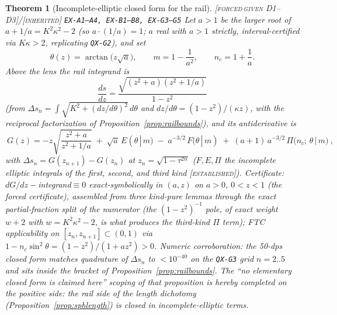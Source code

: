 \documentclass[11pt]{article}
\newcommand{\tagFD}{\textcolor{cF}{\textsc{[forced}}\,\textcolor{cD}{\textsc{given D1--D3]}}}
\newcommand{\tagI}{\textcolor{cI}{\textsc{[inherited]}}}
\newcommand{\tagE}{\textcolor{cE}{\textsc{[established]}}}
\newcommand{\hx}[1]{\textcolor{cC}{\footnotesize\texttt{#1}}}
\theoremstyle{plain}
\newtheorem{theorem}{Theorem}[section]
\theoremstyle{definition}
\theoremstyle{remark}
\begin{document}
\begin{theorem}[Incomplete-elliptic closed form for the rail]\label{thm:railclosed}\tagFD{}/\tagI{} \hx{EX-A1--A4, EX-B1--B8, EX-G3--G5}
Let $a>1$ be the larger root of $a+1/a=K^2\kappa^2-2$ (so
$a\cdot(1/a)=1$; $a$ real with $a>1$ strictly, interval-certified via
$K\kappa>2$, replicating \hx{QX-G2}), and set
\[
\theta(z)=\arctan\!\bigl(z\sqrt a\bigr),\qquad
m=1-\frac1{a^2},\qquad
n_c=1+\frac1a .
\]
Above the lens the rail integrand is
\[
\frac{ds}{dz}=\frac{\sqrt{(z^2+a)(z^2+1/a)}}{1-z^2}
\]
(from $\Delta s_n=\int\sqrt{K^2+(dz/d\theta)^2}\,d\theta$ and
$dz/d\theta=(1-z^2)/(\kappa z)$, with the reciprocal factorization of
Proposition~\ref{prop:railbounds}), and its antiderivative is
\[
\boxed{\ G(z)=-z\sqrt{\frac{z^2+a}{z^2+1/a}}
\;+\;\sqrt a\,E(\theta\,|\,m)
\;-\;a^{-3/2}\,F(\theta\,|\,m)
\;+\;(a+1)\,a^{-3/2}\,\Pi\!\bigl(n_c;\,\theta\,|\,m\bigr)\ },
\]
with $\Delta s_n=G(z_{n+1})-G(z_n)$ at $z_n=\sqrt{1-\tau^{2n}}$
($F,E,\Pi$ the incomplete elliptic integrals of the first, second, and
third kind \tagE{}). Certificate: $dG/dz-{}$integrand${}\equiv0$
exact-symbolically in $(a,z)$ on $a>0$, $0<z<1$ (the forced certificate),
assembled from three kind-pure lemmas through the exact partial-fraction
split of the numerator (the $(1-z^2)^{-1}$ pole, of exact weight $w+2$
with $w=K^2\kappa^2-2$, is what produces the third-kind $\Pi$ term); FTC
applicability on $[z_n,z_{n+1}]\subset(0,1)$ via
$1-n_c\sin^2\theta=(1-z^2)/(1+az^2)>0$. Numeric corroboration: the 50-dps
closed form matches quadrature of $\Delta s_n$ to $<10^{-40}$ on the
\hx{QX-G3} grid $n=2..5$ and sits inside the bracket of
Proposition~\ref{prop:railbounds}. The ``no elementary closed form is
claimed here'' scoping of that proposition is hereby completed on the
positive side: the rail side of the length dichotomy
(Proposition~\ref{prop:sphlength}) is \emph{closed in incomplete-elliptic
terms}.
\end{theorem}
\end{document}
